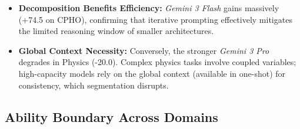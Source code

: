 \documentclass[11pt]{article}
\begin{document}
\begin{itemize}[leftmargin=*, noitemsep, topsep=2pt]
    \item \textbf{Decomposition Benefits Efficiency:} \textit{Gemini 3 Flash} gains massively (+74.5 on CPHO), confirming that iterative prompting effectively mitigates the limited reasoning window of smaller architectures.
    \item \textbf{Global Context Necessity:} Conversely, the stronger \textit{Gemini 3 Pro} degrades in Physics (-20.0). Complex physics tasks involve coupled variables; high-capacity models rely on the global context (available in one-shot) for consistency, which segmentation disrupts.
\end{itemize}

\begin{table}[h]
\centering
\small
\setlength{\tabcolsep}{3pt}
\renewcommand{\arraystretch}{0.95}
\caption{Impact of the iterative protocol. \textit{Flash} relies on decomposition, while \textit{Pro} utilizes global context in Physics.}
\label{tab:ablation_protocol}
\end{table}











\subsection{Ability Boundary Across Domains}~\label{sec:llm-ability}
\end{document}
